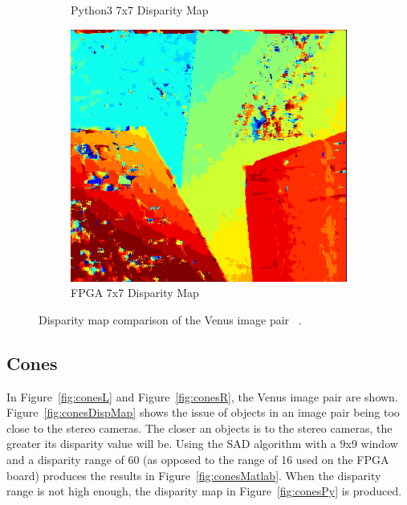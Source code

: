 \begin{figure}
\begin{center}
\begin{subfigure}{0.45\textwidth}
		\caption{Python3 7x7 Disparity Map}
		\label{fig:venusPy}
	\end{subfigure}
	\begin{subfigure}{0.45\textwidth}
		\includegraphics[width=\textwidth]{figures/venus_7x7_fpga.png}
		\caption{FPGA 7x7 Disparity Map}
		\label{fig:venusFPGA}
	\end{subfigure}
	\captionfonts
	\caption{Disparity map comparison of the Venus image pair ~\cite{middlebury}.}
	\label{fig:venusDispMap}
\end{center}
\end{figure}


\subsection{Cones}
\label{sec:cones}

In Figure~\ref{fig:conesL} and Figure~\ref{fig:conesR}, the Venus image pair are shown. Figure~\ref{fig:conesDispMap} shows the issue of objects in an image pair being too close to the stereo cameras. The closer an objects is to the stereo cameras, the greater its disparity value will be. Using the SAD algorithm with a 9x9 window and a disparity range of 60 (as opposed to the range of 16 used on the FPGA board) produces the results in Figure~\ref{fig:conesMatlab}. When the disparity range is not high enough, the disparity map in Figure~\ref{fig:conesPy} is produced.

